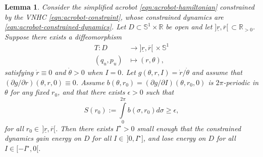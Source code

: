 \documentclass[journal,twoside,web, onecolumn, draftcls]{ieeecolor}
\newtheorem{lemma}{Lemma} %
\newcommand*{\R}{\mathbb{R}}
\newcommand*{\Sone}{\mathbb{S}^1}
\newcommand*{\SxR}{\Sone \times \R}
\begin{document}
\begin{lemma}\label{lemma:energy-regulation-D}
    Consider the simplified acrobot \eqref{eqn:acrobot-hamiltonian} constrained
    by the VNHC \eqref{eqn:acrobot-constraint}, whose constrained dynamics are
    \eqref{eqn:acrobot-constrained-dynamics}.
    Let \(D \subset \SxR\) be open and 
    let \(]\underline{r}, \overline{r}[ \, \subset \R_{> 0}\).
    Suppose there exists a diffeomorphism 
    \begin{align*}
        T : D &\to ]\underline{r},\overline{r}[ \, \times \Sone \\
        (q_u,p_u) &\mapsto (r,\theta)
        ,
    \end{align*}
    satisfying \(\dot{r} \equiv 0\) and \(\dot{\theta} > 0\) when
    \(I = 0\).
    Let \(g(\theta,r,I) = \dot{r}/\dot{\theta}\) and assume that 
    \((\partial g/\partial r)(\theta,r,0) \equiv 0\).
    Assume \(b(\theta,r_0) = (\partial g/\partial I)(\theta,r_0,0)\)
    is \(2\pi\)-periodic in \(\theta\) for any fixed \(r_0\),
    and that there exists \(\epsilon > 0\) such that 
    \[
        S(r_0) := \int \limits_0^{2\pi} b(\sigma,r_0)d\sigma \geq \epsilon
        ,
    \]
    for all \(r_0 \in \, ]\underline{r},\overline{r}[\).
    Then there exists \(I^\star > 0\) small enough that the constrained dynamics
    gain energy on \(D\) for all \(I \in \,]0, I^\star]\), and lose energy on \(D\)
    for all \(I \in [-I^\star, 0[\).
\end{lemma}
\end{document}
